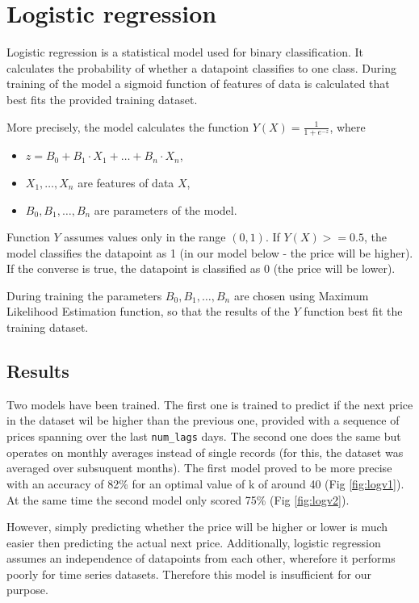 \section{Logistic regression}


Logistic regression \cite{logistic_regression} is a statistical model used for binary classification.
It calculates the probability of whether a datapoint classifies to one class.
During training of the model a sigmoid function of features of data is calculated that best fits the provided training dataset.

More precisely, the model calculates the function \(Y(X) = \frac{1}{1+e^{-z}}\), where
\begin{itemize}
	\item \(z = B_0 + B_1\cdot X_1 + \ldots + B_n\cdot X_n\),
	\item \(X_1, \ldots, X_n\) are features of data \(X\),
	\item \(B_0, B_1, \ldots, B_n\) are parameters of the model.
\end{itemize}
Function \(Y\) assumes values only in the range \((0,1)\).
If \(Y(X) >= 0.5\), the model classifies the datapoint as 1 (in our model below - the price will be higher). If the converse is true, the datapoint is classified as 0 (the price will be lower).

During training the parameters \(B_0, B_1, \ldots, B_n\) are chosen using Maximum Likelihood Estimation function, so that the results of the \(Y\) function best fit the training dataset.

\subsection{Results}
Two models have been trained.
The first one is trained to predict if the next price in the dataset wil be higher than the previous one, provided with a sequence of prices spanning over the last \verb|num_lags| days.
The second one does the same but operates on monthly averages instead of single records (for this, the dataset was averaged over subsuquent months).
The first model proved to be more precise with an accuracy of 82\% for an optimal value of k of around 40 (Fig \ref{fig:logv1}). At the same time the second model only scored 75\% (Fig \ref{fig:logv2}).

However, simply predicting whether the price will be higher or lower is much easier then predicting the actual next price.
Additionally, logistic regression assumes an independence of datapoints from each other, wherefore it performs poorly for time series datasets.
Therefore this model is insufficient for our purpose.

